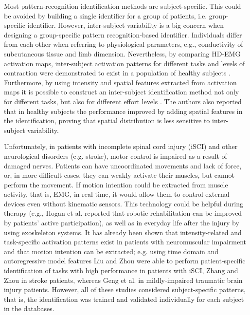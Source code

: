 Most pattern-recognition identification methods are subject-specific. This could be avoided by building a single identifier for a group of patients, i.e. group-specific identifier. However, inter-subject variability is a big concern when designing a group-specific pattern recognition-based identifier. Individuals differ from each other when referring to physiological parameters, e.g., conductivity of subcutaneous tissue and limb dimension. Nevertheless, by comparing HD-EMG activation maps, inter-subject activation patterns for different tasks and levels of contraction were demonstrated to exist in a population of healthy subjects \citep{Rojas-Martinez2012}. Furthermore, by using intensity and spatial features extracted from activation maps it is possible to construct an inter-subject identification method not only for different tasks, but also for different effort levels \citep{Rojas-Martinez2013}. The authors also reported that in healthy subjects the performance improved by adding spatial features in the identification, proving that spatial distribution is less sensitive to inter-subject variability.

Unfortunately, in patients with incomplete spinal cord injury (iSCI) and other neurological disorders (e.g. stroke), motor control is impaired as a result of damaged nerves. Patients can have uncoordinated movements and lack of force, or, in more difficult cases, they can weakly activate their muscles, but cannot perform the movement. If motion intention could be extracted from muscle activity, that is, EMG, in real time, it would allow them to control external devices even without kinematic sensors. This technology could be helpful during therapy (e.g., Hogan et al. \citep{Hogan2006} reported that robotic rehabilitation can be improved by patients’ active participation), as well as in everyday life after the injury by using exoskeleton systems. It has already been shown that intensity-related and task-specific activation patterns exist in patients with neuromuscular impairment and that motion intention can be extracted; e.g. using time domain and autoregressive model features Liu and Zhou \citep{Liu2013} were able to perform patient-specific identification of tasks with high performance in patients with iSCI, Zhang and Zhou \citep{Zhang2012} in stroke patients, whereas Geng et al. \citep{Geng2014} in mildly-impaired traumatic brain injury patients. However, all of these studies considered subject-specific patterns, that is, the identification was trained and validated individually for each subject in the databases.

